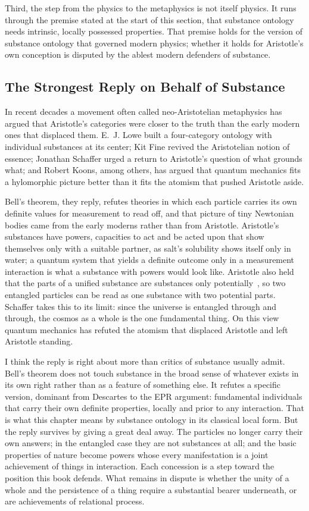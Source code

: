 Third, the step from the physics to the metaphysics is not itself physics. It runs through the premise stated at the start of this section, that substance ontology needs intrinsic, locally possessed properties. That premise holds for the version of substance ontology that governed modern physics; whether it holds for Aristotle's own conception is disputed by the ablest modern defenders of substance.

\subsection*{The Strongest Reply on Behalf of Substance}

In recent decades a movement often called neo-Aristotelian metaphysics has argued that Aristotle's categories were closer to the truth than the early modern ones that displaced them. E.~J. Lowe built a four-category ontology with individual substances at its center; Kit Fine revived the Aristotelian notion of essence; Jonathan Schaffer urged a return to Aristotle's question of what grounds what; and Robert Koons, among others, has argued that quantum mechanics fits a hylomorphic picture better than it fits the atomism that pushed Aristotle aside.

Bell's theorem, they reply, refutes theories in which each particle carries its own definite values for measurement to read off, and that picture of tiny Newtonian bodies came from the early moderns rather than from Aristotle. Aristotle's substances have powers, capacities to act and be acted upon that show themselves only with a suitable partner, as salt's solubility shows itself only in water; a quantum system that yields a definite outcome only in a measurement interaction is what a substance with powers would look like. Aristotle also held that the parts of a unified substance are substances only potentially~\citep[Book~VII, chs.~13 and~16]{Aristotle_Metaphysics}, so two entangled particles can be read as one substance with two potential parts. Schaffer takes this to its limit: since the universe is entangled through and through, the cosmos as a whole is the one fundamental thing. On this view quantum mechanics has refuted the atomism that displaced Aristotle and left Aristotle standing.

I think the reply is right about more than critics of substance usually admit. Bell's theorem does not touch substance in the broad sense of whatever exists in its own right rather than as a feature of something else. It refutes a specific version, dominant from Descartes to the EPR argument: fundamental individuals that carry their own definite properties, locally and prior to any interaction. That is what this chapter means by substance ontology in its classical local form. But the reply survives by giving a great deal away. The particles no longer carry their own answers; in the entangled case they are not substances at all; and the basic properties of nature become powers whose every manifestation is a joint achievement of things in interaction. Each concession is a step toward the position this book defends. What remains in dispute is whether the unity of a whole and the persistence of a thing require a substantial bearer underneath, or are achievements of relational process.

